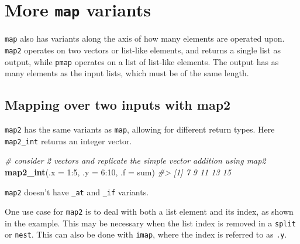 \documentclass[]{book}
\newenvironment{Shaded}{}{}
\newcommand{\CommentTok}[1]{\textcolor[rgb]{0.38,0.63,0.69}{\textit{#1}}}
\newcommand{\DataTypeTok}[1]{\textcolor[rgb]{0.56,0.13,0.00}{#1}}
\newcommand{\DecValTok}[1]{\textcolor[rgb]{0.25,0.63,0.44}{#1}}
\newcommand{\KeywordTok}[1]{\textcolor[rgb]{0.00,0.44,0.13}{\textbf{#1}}}
\newcommand{\NormalTok}[1]{#1}
\newcommand{\OperatorTok}[1]{\textcolor[rgb]{0.40,0.40,0.40}{#1}}
\begin{document}
\hypertarget{more-map-variants}{%
\section{\texorpdfstring{More \texttt{map} variants}{More map variants}}\label{more-map-variants}}

\texttt{map} also has variants along the axis of how many elements are operated upon. \texttt{map2} operates on two vectors or list-like elements, and returns a single list as output, while \texttt{pmap} operates on a list of list-like elements.
The output has as many elements as the input lists, which must be of the same length.

\hypertarget{mapping-over-two-inputs-with-map2}{%
\subsection{Mapping over two inputs with map2}\label{mapping-over-two-inputs-with-map2}}

\texttt{map2} has the same variants as \texttt{map}, allowing for different return types.
Here \texttt{map2\_int} returns an integer vector.

\begin{Shaded}
\begin{Highlighting}[]
\CommentTok{# consider 2 vectors and replicate the simple vector addition using map2}
\KeywordTok{map2_int}\NormalTok{(}\DataTypeTok{.x =} \DecValTok{1}\OperatorTok{:}\DecValTok{5}\NormalTok{, }
     \DataTypeTok{.y =} \DecValTok{6}\OperatorTok{:}\DecValTok{10}\NormalTok{,}
     \DataTypeTok{.f =}\NormalTok{ sum)}
\CommentTok{#> [1]  7  9 11 13 15}
\end{Highlighting}
\end{Shaded}

\texttt{map2} doesn't have \texttt{\_at} and \texttt{\_if} variants.

One use case for \texttt{map2} is to deal with both a list element and its index, as shown in the example. This may be necessary when the list index is removed in a \texttt{split} or \texttt{nest}. This can also be done with \texttt{imap}, where the index is referred to as \texttt{.y}.
\end{document}

